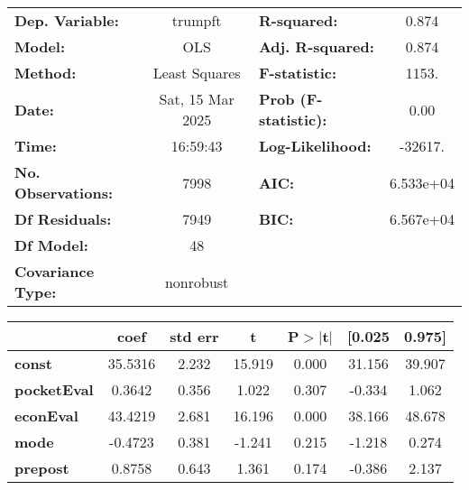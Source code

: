\begin{center}
\begin{tabular}{lclc}
\toprule
\textbf{Dep. Variable:}         &     trumpft      & \textbf{  R-squared:         } &     0.874   \\
\textbf{Model:}                 &       OLS        & \textbf{  Adj. R-squared:    } &     0.874   \\
\textbf{Method:}                &  Least Squares   & \textbf{  F-statistic:       } &     1153.   \\
\textbf{Date:}                  & Sat, 15 Mar 2025 & \textbf{  Prob (F-statistic):} &     0.00    \\
\textbf{Time:}                  &     16:59:43     & \textbf{  Log-Likelihood:    } &   -32617.   \\
\textbf{No. Observations:}      &        7998      & \textbf{  AIC:               } & 6.533e+04   \\
\textbf{Df Residuals:}          &        7949      & \textbf{  BIC:               } & 6.567e+04   \\
\textbf{Df Model:}              &          48      & \textbf{                     } &             \\
\textbf{Covariance Type:}       &    nonrobust     & \textbf{                     } &             \\
\bottomrule
\end{tabular}
\begin{tabular}{lcccccc}
                                & \textbf{coef} & \textbf{std err} & \textbf{t} & \textbf{P$> |$t$|$} & \textbf{[0.025} & \textbf{0.975]}  \\
\midrule
\textbf{const}                  &      35.5316  &        2.232     &    15.919  &         0.000        &       31.156    &       39.907     \\
\textbf{pocketEval}             &       0.3642  &        0.356     &     1.022  &         0.307        &       -0.334    &        1.062     \\
\textbf{econEval}               &      43.4219  &        2.681     &    16.196  &         0.000        &       38.166    &       48.678     \\
\textbf{mode}                   &      -0.4723  &        0.381     &    -1.241  &         0.215        &       -1.218    &        0.274     \\
\textbf{prepost}                &       0.8758  &        0.643     &     1.361  &         0.174        &       -0.386    &        2.137     \\

\end{tabular}
\end{center}
